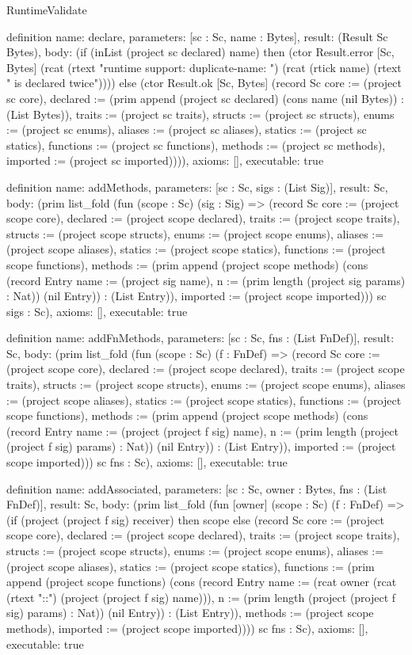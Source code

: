 \begin{lexlean}{RuntimeValidate}
\begin{semanticmodule}
definition{
  name: declare,
  parameters: [sc : Sc, name : Bytes],
  result: (Result Sc Bytes),
  body: (if (inList (project sc declared) name) then (ctor Result.error [Sc, Bytes] (rcat (rtext "runtime support: duplicate-name: ") (rcat (rtick name) (rtext " is declared twice")))) else (ctor Result.ok [Sc, Bytes] (record Sc {core := (project sc core), declared := (prim append (project sc declared) (cons name (nil Bytes)) : (List Bytes)), traits := (project sc traits), structs := (project sc structs), enums := (project sc enums), aliases := (project sc aliases), statics := (project sc statics), functions := (project sc functions), methods := (project sc methods), imported := (project sc imported)}))),
  axioms: [],
  executable: true
}

definition{
  name: addMethods,
  parameters: [sc : Sc, sigs : (List Sig)],
  result: Sc,
  body: (prim list_fold (fun (scope : Sc) (sig : Sig) => (record Sc {core := (project scope core), declared := (project scope declared), traits := (project scope traits), structs := (project scope structs), enums := (project scope enums), aliases := (project scope aliases), statics := (project scope statics), functions := (project scope functions), methods := (prim append (project scope methods) (cons (record Entry {name := (project sig name), n := (prim length (project sig params) : Nat)}) (nil Entry)) : (List Entry)), imported := (project scope imported)})) sc sigs : Sc),
  axioms: [],
  executable: true
}

definition{
  name: addFnMethods,
  parameters: [sc : Sc, fns : (List FnDef)],
  result: Sc,
  body: (prim list_fold (fun (scope : Sc) (f : FnDef) => (record Sc {core := (project scope core), declared := (project scope declared), traits := (project scope traits), structs := (project scope structs), enums := (project scope enums), aliases := (project scope aliases), statics := (project scope statics), functions := (project scope functions), methods := (prim append (project scope methods) (cons (record Entry {name := (project (project f sig) name), n := (prim length (project (project f sig) params) : Nat)}) (nil Entry)) : (List Entry)), imported := (project scope imported)})) sc fns : Sc),
  axioms: [],
  executable: true
}

definition{
  name: addAssociated,
  parameters: [sc : Sc, owner : Bytes, fns : (List FnDef)],
  result: Sc,
  body: (prim list_fold (fun [owner] (scope : Sc) (f : FnDef) => (if (project (project f sig) receiver) then scope else (record Sc {core := (project scope core), declared := (project scope declared), traits := (project scope traits), structs := (project scope structs), enums := (project scope enums), aliases := (project scope aliases), statics := (project scope statics), functions := (prim append (project scope functions) (cons (record Entry {name := (rcat owner (rcat (rtext "::") (project (project f sig) name))), n := (prim length (project (project f sig) params) : Nat)}) (nil Entry)) : (List Entry)), methods := (project scope methods), imported := (project scope imported)}))) sc fns : Sc),
  axioms: [],
  executable: true
}


\end{semanticmodule}
\end{lexlean}
